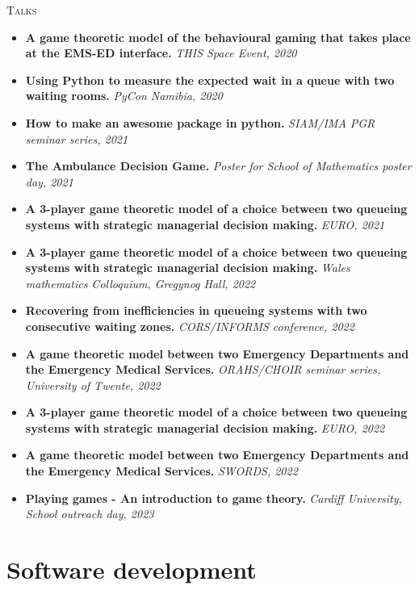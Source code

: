 \textsc{Talks}
\begin{itemize}
    \item \textbf{A game theoretic model of the behavioural gaming that takes
    place at the EMS-ED interface.} \emph{THIS Space Event, 2020}
    \item \textbf{Using Python to measure the expected wait in a queue with two
    waiting rooms.} \emph{PyCon Namibia, 2020}
    \item \textbf{How to make an awesome package in python.} \emph{SIAM/IMA PGR
    seminar series, 2021}
    \item \textbf{The Ambulance Decision Game.} \emph{Poster for School of
    Mathematics poster day, 2021}
    \item \textbf{A 3-player game theoretic model of a choice between two
    queueing systems with strategic managerial decision making.}
    \emph{EURO, 2021}
    \item \textbf{A 3-player game theoretic model of a choice between two
    queueing systems with strategic managerial decision making.}
    \emph{Wales mathematics Colloquium, Gregynog Hall, 2022}
    \item \textbf{Recovering from inefficiencies in queueing systems with two
    consecutive waiting zones.} \emph{CORS/INFORMS conference, 2022}
    \item \textbf{A game theoretic model between two Emergency Departments and
    the Emergency Medical Services.}
    \emph{ORAHS/CHOIR seminar series, University of Twente, 2022}
    \item \textbf{A 3-player game theoretic model of a choice between two
    queueing systems with strategic managerial decision making.}
    \emph{EURO, 2022}
    \item \textbf{A game theoretic model between two Emergency Departments and
    the Emergency Medical Services.} \emph{SWORDS, 2022}
    \item \textbf{Playing games - An introduction to game theory.}
    \emph{Cardiff University, School outreach day, 2023}
\end{itemize}

\section*{Software development}

